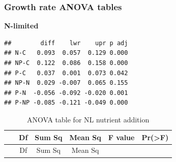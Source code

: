 \documentclass[]{article}
\begin{document}
\newpage

\subsubsection{Growth rate ANOVA tables}\label{growth-rate-anova-tables}

\textbf{N-limited}

\begin{verbatim}
##        diff    lwr    upr p adj
## N-C   0.093  0.057  0.129 0.000
## NP-C  0.122  0.086  0.158 0.000
## P-C   0.037  0.001  0.073 0.042
## NP-N  0.029 -0.007  0.065 0.155
## P-N  -0.056 -0.092 -0.020 0.001
## P-NP -0.085 -0.121 -0.049 0.000
\end{verbatim}

\begin{longtable}[]{@{}cccccc@{}}
\caption{ANOVA table for NL nutrient addition}\tabularnewline
\toprule
\begin{minipage}[b]{0.19\columnwidth}\centering\strut
~
\strut\end{minipage} &
\begin{minipage}[b]{0.06\columnwidth}\centering\strut
Df
\strut\end{minipage} &
\begin{minipage}[b]{0.10\columnwidth}\centering\strut
Sum Sq
\strut\end{minipage} &
\begin{minipage}[b]{0.12\columnwidth}\centering\strut
Mean Sq
\strut\end{minipage} &
\begin{minipage}[b]{0.12\columnwidth}\centering\strut
F value
\strut\end{minipage} &
\begin{minipage}[b]{0.12\columnwidth}\centering\strut
Pr(\textgreater{}F)
\strut\end{minipage}\tabularnewline
\midrule
\endfirsthead
\toprule
\begin{minipage}[b]{0.19\columnwidth}\centering\strut
~
\strut\end{minipage} &
\begin{minipage}[b]{0.06\columnwidth}\centering\strut
Df
\strut\end{minipage} &
\begin{minipage}[b]{0.10\columnwidth}\centering\strut
Sum Sq
\strut\end{minipage} &
\begin{minipage}[b]{0.12\columnwidth}\centering\strut
Mean Sq
\strut\end{minipage} &

\end{longtable}
\end{document}
